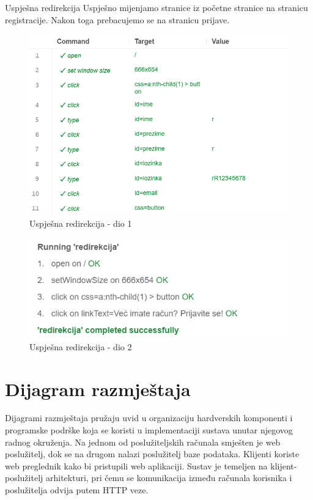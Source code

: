 		   \item Uspješna redirekcija
		   Uspješno mijenjamo stranice iz početne stranice na stranicu registracije. Nakon toga prebacujemo se na stranicu prijave.
		   \begin{figure}[H]
		   	\includegraphics[scale=0.30]{slike/deploy/fTest4a.png}
		   	\centering
		   	\caption{Uspješna redirekcija - dio 1}
		   	\label{fig:fTest4a}
		   \end{figure}
		   \begin{figure}[H]
		   	\includegraphics[scale=0.30]{slike/deploy/fTest4b.png}
		   	\centering
		   	\caption{Uspješna redirekcija - dio 2}
		   	\label{fig:fTest4b}
		   \end{figure}
   
    

  
		
		\eject
		\section{Dijagram razmještaja}

			Dijagrami razmještaja pružaju uvid u organizaciju hardverskih komponenti i programske podrške koja se koristi u implementaciji sustava unutar njegovog radnog okruženja. Na jednom od poslužiteljskih računala smješten je web poslužitelj, dok se na drugom nalazi poslužitelj baze podataka. Klijenti koriste web preglednik kako bi pristupili web aplikaciji. Sustav je temeljen na klijent-poslužitelj arhitekturi, pri čemu se komunikacija između računala korisnika i poslužitelja odvija putem HTTP veze.
			
